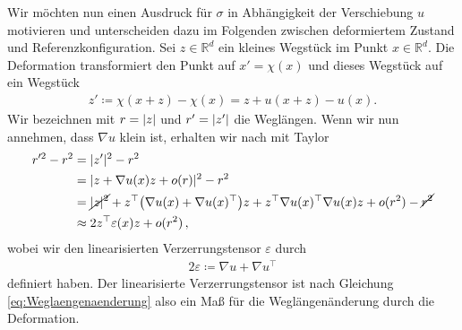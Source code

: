 \documentclass{scrartcl}
\def\R{\mathbb{R}}
\def\e{\varepsilon}
\DeclarePairedDelimiter{\abs}{\lvert}{\rvert}
\begin{document}
Wir möchten nun einen Ausdruck für $\sigma$ in Abhängigkeit der Verschiebung $u$ motivieren und unterscheiden dazu im Folgenden zwischen deformiertem Zustand und Referenzkonfiguration.
Sei $z\in\R^d$ ein kleines Wegstück im Punkt $x\in\R^d$. Die Deformation transformiert den Punkt auf $x'=\chi(x)$ und dieses Wegstück auf ein Wegstück
\begin{align*}
	z'\coloneqq \chi(x+z)-\chi(x)=z+u(x+z)-u(x).
\end{align*}
Wir bezeichnen mit $r=\abs{z}$ und $r'=\abs{z'}$ die Weglängen.
Wenn wir nun annehmen, dass $\nabla u$ klein ist, erhalten wir nach \cite[(1.3) in VI.§1]{Bra-2007} mit Taylor
\begin{align}
	\begin{aligned}
	r'^2 -r^2
	&= \abs{z'}^2-r^2 \\
	&= \abs{z+\nabla u(x)z+o(r)}^2-r^2 \\
	&= \cancel{\abs{z}^2} + z^\top\big(\nabla u(x)+\nabla u(x)^\top\big)z+z^\top\nabla u(x)^\top\nabla u(x) z+o(r^2)-\cancel{r^2}\\
	&\approx 2z^\top\e(x) z+o(r^2)\,,
	\end{aligned}\label{eq:Weglaengenaenderung}
\end{align}
wobei wir den linearisierten Verzerrungstensor $\e$ durch
\begin{align*}
	2\e \coloneqq \nabla u  + \nabla u^\top
\end{align*}
definiert haben. Der linearisierte Verzerrungstensor ist nach Gleichung \eqref{eq:Weglaengenaenderung} also ein Maß für die Weglängenänderung durch die Deformation.
\end{document}
